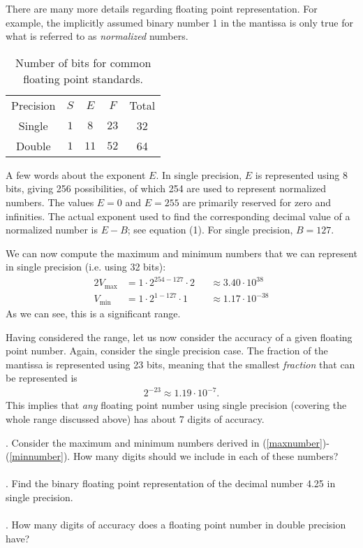 There are many more details regarding floating point representation. For
example, the implicitly assumed binary number 1 in the mantissa is only true for
what is referred to as {\em normalized} numbers.

\begin{table}
  \centering
  \bgroup{}
  \begin{tabular}{ccccc} \hline
    Precision & $S$ & $E$ & $F$ & Total \\ \hhline{=====}
    Single & $1$ & $8$ & $23$ & 32
    \\ \hline
    Double & $1$ & $11$ & $52$ & 64
    \\ \hline
  \end{tabular}
  \egroup
  \caption{
    Number of bits for common floating point standards.
  }
\end{table}

A few words about the exponent $E$. In single precision, $E$ is represented
using 8 bits, giving 256 possibilities, of which 254 are used to represent
normalized numbers. The values $E=0$ and $E=255$ are primarily reserved for zero
and infinities. The actual exponent used to find the corresponding decimal value
of a normalized number is $E-B$; see equation (1). For single precision,
$B=127$.

We can now compute the maximum and minimum numbers that we can represent in
single precision (i.e. using 32 bits):
\begin{alignat}{2}
  \label{maxnumber}
  V_{\text{max}} &= 1 \cdot 2^{254-127} \cdot 2 &&\approx 3.40 \cdot 10^{38} \\
  \label{minnumber}
  V_{\text{min}} &= 1\cdot 2^{1-127} \cdot 1 &&\approx 1.17 \cdot 10^{-38}
\end{alignat}
As we can see, this is a significant range.

Having considered the range, let us now consider the accuracy of a given
floating point number. Again, consider the single precision case. The fraction
of the mantissa is represented using 23 bits, meaning that the smallest {\em
fraction} that can be represented is
\begin{align*}
  2^{-23} \approx 1.19 \cdot 10^{-7}.
\end{align*}
This implies that {\em any} floating point number using single precision
(covering the whole range discussed above) has about 7 digits of accuracy.

. Consider the maximum and minimum numbers
derived in (\ref{maxnumber})-(\ref{minnumber}). How many digits should we
include in each of these numbers?\\
\\
. Find the binary floating point representation
of the decimal number 4.25 in single precision.\\
\\
. How many digits of accuracy does a floating
point number in double precision have?

